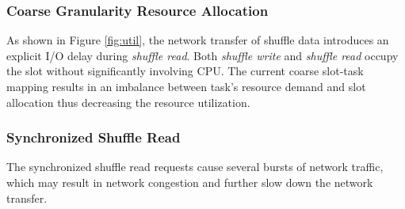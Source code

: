 \subsubsection{Coarse Granularity Resource Allocation}
{\color{black}
As shown in Figure \ref{fig:util}, the network transfer of shuffle data introduces an explicit I/O delay during \textit{shuffle read}.
Both \textit{shuffle write} and \textit{shuffle read} occupy the slot without significantly involving CPU.
The current coarse slot-task mapping results in an imbalance between task's resource demand and slot allocation thus decreasing the resource utilization. 


\subsubsection{Synchronized Shuffle Read}

The synchronized shuffle read requests cause several bursts of network traffic, which may result in network congestion and further slow down the network transfer.



}
